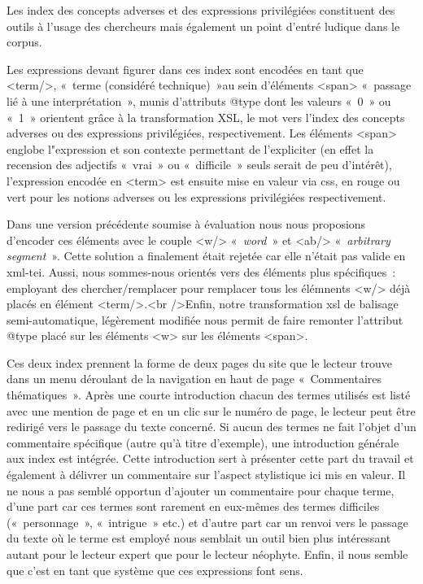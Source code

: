 Les index des concepts adverses et des expressions privilégiées constituent des outils à l'usage des chercheurs mais également un point d'entré ludique dans le corpus.

 \label{encW} Les expressions devant figurer dans ces index sont encodées en tant que <term/>, «~terme (considéré technique)~»au sein d'éléments <span> «~passage lié à une interprétation~», munis d'attributs @type dont les valeurs «~0~» ou «~1~» orientent grâce à la transformation XSL, le mot vers l'index des concepts adverses ou des expressions privilégiées, respectivement. Les éléments <span> englobe l"expression et son contexte permettant de l'expliciter (en effet la recension des adjectifs «~vrai~» ou «~difficile~»  seuls serait de peu d'intérêt), l'expression encodée en <term> est ensuite mise en valeur via css, en rouge ou vert pour les notions adverses ou les expressions privilégiées respectivement.

Dans une version précédente soumise à évaluation nous nous proposions d'encoder ces éléments avec le couple <w/> «~\textit{word}~» et <ab/> «~\textit{arbitrary segment}~». Cette solution a finalement était rejetée car elle n'était pas valide en xml-tei. Aussi, nous sommes-nous orientés vers des éléments plus spécifiques~: employant des chercher/remplacer pour remplacer tous les élémnents <w/> déjà placés en élément <term/>.<br />Enfin, notre transformation xsl de balisage semi-automatique, légèrement modifiée nous permit de faire remonter l'attribut @type placé sur les éléments <w> sur les éléments <span>.


Ces deux index prennent la forme de deux pages du site que le lecteur trouve dans un menu déroulant de la navigation en haut de page «~Commentaires thématiques~». Après une courte introduction chacun des termes utilisés est listé avec une mention de page et en un clic sur le numéro de page, le lecteur peut être redirigé vers le passage du texte concerné. Si aucun des termes ne fait l'objet d'un commentaire spécifique (autre qu'à titre d'exemple), une introduction générale aux index est intégrée. Cette introduction sert à présenter cette part du travail et également à délivrer un commentaire sur l'aspect stylistique ici mis en valeur. Il ne nous a pas semblé opportun d'ajouter un commentaire pour chaque terme, d'une part car ces termes sont rarement en eux-mêmes des termes difficiles («~personnage~», «~intrigue~» etc.) et d'autre part car un renvoi vers le passage du texte où le terme est employé nous semblait un outil bien plus intéressant autant pour le lecteur expert que pour le lecteur néophyte. Enfin, il nous semble que c'est en tant que système que ces expressions font sens. 


